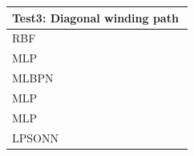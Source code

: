 \documentclass{ieeeaccess}
\begin{document}
\begin{table}[t]
\begin{tabular}{llllllllllll}
		\midrule
		\multicolumn{12}{l}{Test3: Diagonal winding path}                                                                                                                                                                                                                                                                                                                                         \\
		\midrule
		RBF\cite{shareef2008localization}  &                       &                       &                       &                           &                       &                       &                       &                           &                                           &                                                 &                                                 \\
		MLP\cite{rahman2009localization}   &                       &                       &                       &                           &                       &                       &                       &                           &                                           &                                                 &                                                 \\
		MLBPN\cite{singh2013tdoa}          &                       &                       &                       &                           &                       &                       &                       &                           &                                           &                                                 &                                                 \\
		MLP\cite{abdelhadi2013efficient}   &                       &                       &                       &                           &                       &                       &                       &                           &                                           &                                                 &                                                 \\
		MLP\cite{kumar2016localization}    &                       &                       &                       &                           &                       &                       &                       &                           &                                           &                                                 &                                                 \\
		LPSONN\cite{banihashemian2018new}  &                       &                       &                       &                           &                       &                       &                       &                           &                                           &                                                 &                                                 \\

\end{tabular}
\end{table}
\end{document}
